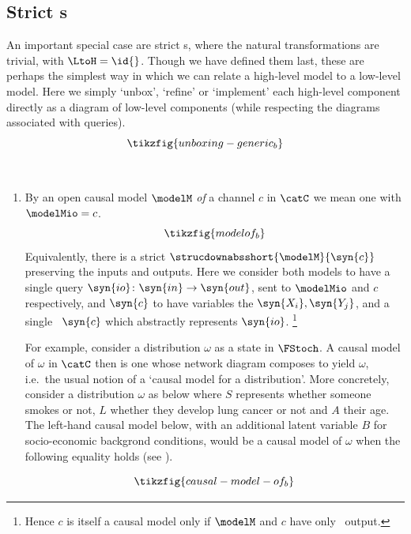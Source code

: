 \documentclass{article}
\begin{document}
 \subsection{Strict \strucdown s}

An important special case are strict \strucdown{}s, where the natural transformations are trivial, with $\LtoH=\id{}$. Though we have defined them last, these are perhaps the simplest way in which we can relate a high-level model to a low-level model. Here we simply `unbox', `refine' or `implement' each high-level component directly as a diagram of low-level components (while respecting the diagrams associated with queries).
\[
\tikzfig{unboxing-generic_b}
\]


\begin{examples} \label{ex:strict-a-abs} \
\begin{enumerate}

\item 
By an open causal model $\modelM$ \emph{of} a channel $c$ in $\catC$ we mean one with $\modelMio = c$. 
\[
\tikzfig{modelof_b}
\]
Equivalently, there is a strict \strucdown{} $\strucdownabsshort{\modelM}{\syn{c}}$ preserving the inputs and outputs. Here we consider both models to have a single query $\syn{io} \colon \syn{in} \to \syn{out}$, sent to $\modelMio$ and $c$ respectively, and $\syn{c}$ to have variables the $\syn{X_i}, \syn{Y_j}$, and a single \ $\syn{c}$ which abstractly represents $\syn{io}$. \footnote{Hence $c$ is itself a causal model only if $\modelM$ and $c$ have only \ output.}

For example, consider a distribution $\omega$ as a state in $\FStoch$. A causal model of $\omega$ in $\catC$ then is one whose network diagram composes to yield $\omega$, i.e.~the usual notion of a `causal model for a distribution'. More concretely, consider a distribution $\omega$ as below where $S$ represents whether someone smokes or not, $L$ whether they develop lung cancer or not and $A$ their age. The left-hand causal model below, with an additional latent variable $B$ for socio-economic backgrond conditions, would be a causal model of $\omega$ when the following equality holds (see \cite{CorreaEtAl_2020_CalculusForStochasticInterventions, lorenz2023causal}).

\[
\tikzfig{causal-model-of_b}
\]


\end{enumerate}
\end{examples}
\end{document}
